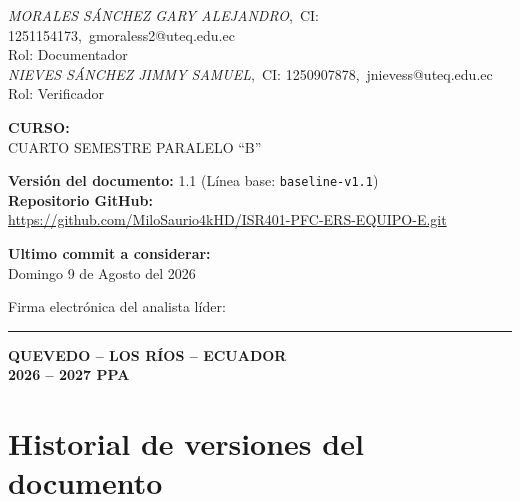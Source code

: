 \documentclass[journal,onecolumn]{IEEEtran}
\begin{document}
\begin{titlepage}
		\textit{MORALES SÁNCHEZ GARY ALEJANDRO},~CI: 1251154173,~gmoraless2@uteq.edu.ec\\
		{\small Rol: Documentador}\\[6pt]
		
		\textit{NIEVES SÁNCHEZ JIMMY SAMUEL},~CI: 1250907878,~jnievess@uteq.edu.ec\\
		{\small Rol: Verificador}
		
		\vspace{0.2cm}
		
		{\normalsize\bfseries CURSO:}\\[4pt]
		{\normalsize CUARTO SEMESTRE PARALELO \enquote{B}}
		
		\vspace{0.2cm}
		
		{\normalsize\bfseries Versión del documento:} 1.1 \quad (Línea base: \texttt{baseline-v1.1})\\[4pt]
		\textbf{Repositorio GitHub:}\\
		\url{https://github.com/MiloSaurio4kHD/ISR401-PFC-ERS-EQUIPO-E.git}
		
		\textbf{Ultimo commit a considerar:}\\
		\normalsize Domingo 9 de Agosto del 2026
		
		\vspace{1.8cm}
		
		{\small Firma electrónica del analista líder: \rule{5cm}{0.4pt}}
		
		{\normalsize\bfseries QUEVEDO -- LOS RÍOS -- ECUADOR}\\[4pt]
		{\normalsize\bfseries 2026 -- 2027 PPA}
		
	\end{titlepage}
	
	\section*{Historial de versiones del documento}
	
\end{document}
